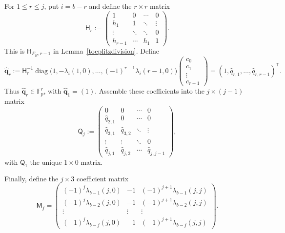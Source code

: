 \documentclass[10pt,a4paper]{amsart}
\newcommand{\F}{\mathbb{F}_p}
\begin{document}
For $1\le r\le j$, put $i=b-r$ and define the $r\times r$ matrix
\begin{equation*}
 \mathsf H_r:=
 \begin{pmatrix}
 1&0&\cdots&0\\
 h_1&1&\ddots&\vdots\\
 \vdots&\ddots&\ddots&0\\
 h_{r-1}&\cdots&h_1&1
 \end{pmatrix}.
\end{equation*}
This is $\mathsf H_{F_H,r-1}$ in Lemma~\ref{toeplitzdivision}.  Define
\begin{equation}\label{history_quotient_vector}
 \widehat{\mathbf q}_r:=
 \mathsf H_r^{-1}
 \operatorname{diag}\!\bigl(
  1,-\lambda_i(1,0),\ldots,(-1)^{r-1}\lambda_i(r-1,0)
 \bigr)
 \begin{pmatrix}c_0\\c_1\\\vdots\\c_{r-1}\end{pmatrix}
 =(1,\widehat q_{r,1},\ldots,\widehat q_{r,r-1})^{\mathsf T}.
\end{equation}
Thus $\widehat{\mathbf q}_r\in\F^r$, with
$\widehat{\mathbf q}_1=(1)$.  Assemble these coefficients into the
$j\times(j-1)$ matrix
\begin{equation*}
 \mathsf Q_j:=
 \begin{pmatrix}
 0&0&\cdots&0\\
 \widehat q_{2,1}&0&\cdots&0\\
 \widehat q_{3,1}&\widehat q_{3,2}&\ddots&\vdots\\
 \vdots&\vdots&\ddots&0\\
 \widehat q_{j,1}&\widehat q_{j,2}&\cdots&\widehat q_{j,j-1}
 \end{pmatrix},
\end{equation*}
with $\mathsf Q_1$ the unique $1\times0$ matrix.

Finally, define the $j\times3$ coefficient matrix
\begin{equation}\label{row}
 \mathsf M_j=
 \begin{pmatrix}
 (-1)^j\lambda_{b-1}(j,0)&-1&(-1)^{j+1}\lambda_{b-1}(j,j)\\
 (-1)^j\lambda_{b-2}(j,0)&-1&(-1)^{j+1}\lambda_{b-2}(j,j)\\
 \vdots&\vdots&\vdots\\
 (-1)^j\lambda_{b-j}(j,0)&-1&(-1)^{j+1}\lambda_{b-j}(j,j)
 \end{pmatrix}.
\end{equation}
\end{document}
